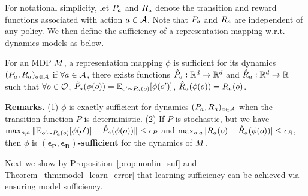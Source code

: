 For notational simplicity, let $P_a$ and $R_a$ denote the transition and reward functions associated with action $a\in\mathcal{A}$.
Note that $P_a$ and $R_a$ are independent of any policy. 
We then define the sufficiency of a representation mapping w.r.t. dynamics models as below.
\begin{definition}
\label{def:model_suf}
For an MDP $M$, a representation mapping $\phi$ is sufficient for its dynamics $(P_a,R_a)_{a\in\mathcal{A}}$ if $\forall a \in \mathcal{A}$, there exists functions $\hat{P}_a: \mathbb{R}^d \to \mathbb{R}^d$ and $\hat{R}_a: \mathbb{R}^d \to \mathbb{R}$ such that $\forall o\in\mathcal{O}$, $\hat{P}_a(\phi(o))=\mathbb{E}_{o^\prime\sim P_a(o)}[\phi(o^\prime)]$, $\hat{R}_a(\phi(o)) = R_a(o)$.
\end{definition}
\vspace{-0.5em}
\textbf{Remarks.} 
(1) $\phi$ is exactly sufficient for dynamics $(P_a,R_a)_{a\in\mathcal{A}}$ when the transition function $P$ is deterministic. 
(2) If $P$ is stochastic, but we have $\max_{o,a}\| \mathbb{E}_{o^\prime\sim P_a(o)}[\phi(o^\prime)] - \hat{P}_a(\phi(o))\|\leq\epsilon_P$ and $\max_{o,a}|R_a(o)-\hat{R}_a(\phi(o))|\leq\epsilon_R$, then $\phi$ is \textbf{$\bm{(\epsilon_P,\epsilon_R)}$-sufficient} for the dynamics of $M$.

Next we show by Proposition~\ref{prop:nonlin_suf} and Theorem~\ref{thm:model_learn_error} that learning sufficiency can be achieved via ensuring model sufficiency.

